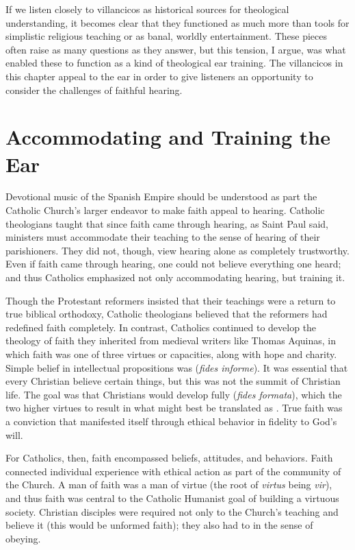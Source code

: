 If we listen closely to villancicos as historical sources for theological
understanding, it becomes clear that they functioned as much more than tools for
simplistic religious teaching or as banal, worldly entertainment.
These pieces often raise as many questions as they answer, but this tension, I
argue, was what enabled these to function as a kind of theological ear training.
The villancicos in this chapter appeal to the ear in order to give listeners an
opportunity to consider the challenges of faithful hearing.


\section{Accommodating and Training the Ear}

Devotional music of the Spanish Empire should be understood as part the Catholic
Church's larger endeavor to make faith appeal to hearing.
Catholic theologians taught that since faith came through hearing, as Saint Paul
said, ministers must accommodate their teaching to the sense of hearing of their
parishioners.
They did not, though, view hearing alone as completely trustworthy.
Even if faith came through hearing, one could not believe everything one heard;
and thus Catholics emphasized not only accommodating hearing, but training it.

Though the Protestant reformers insisted that their teachings were a return to
true biblical orthodoxy, Catholic theologians believed that the reformers had
redefined faith completely.
In contrast, Catholics continued to develop the theology of faith they inherited
from medieval writers like Thomas Aquinas, in which faith was one of three
virtues or capacities, along with hope and charity.%
    \Autocite[130--132]{Schreiner:Certainty}
Simple belief in intellectual propositions was 
(\emph{fides informe}).%
    \Autocite[]{Catholic:Catechismus1614}
It was essential that every Christian believe certain things, but this was not
the summit of Christian life.
The goal was that Christians would develop fully 
(\emph{fides formata}), which  the two higher virtues to
result in  what might best be translated as .
True faith was a conviction that manifested itself through ethical behavior in
fidelity to God's will.

For Catholics, then, faith encompassed beliefs, attitudes, and behaviors.
Faith connected individual experience with ethical action as part of the
community of the Church.
A man of faith was a man of virtue (the root of \emph{virtus} being \emph{vir}),
and thus faith was central to the Catholic Humanist goal of building a virtuous
society.
Christian disciples were required not only to  the Church's
teaching and believe it (this would be unformed faith); they also had to
 in the sense of obeying.

